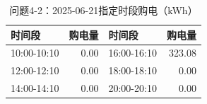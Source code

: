 \begin{table}[H]\centering\small\caption{问题4-2：2025-06-21指定时段购电（kWh）}\label{tab:q4_220250621p}
\begin{tabular}{lrlr}\toprule
时间段 & 购电量 & 时间段 & 购电量\\\midrule
10:00-10:10 & 0.00 & 16:00-16:10 & 323.08\\
12:00-12:10 & 0.00 & 18:00-18:10 & 0.00\\
14:00-14:10 & 0.00 & 20:00-20:10 & 0.00\\
\bottomrule\end{tabular}\end{table}
